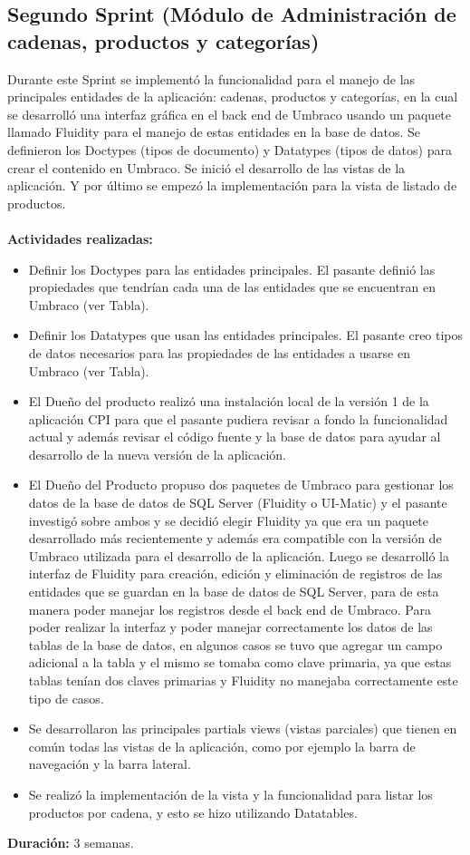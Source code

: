 \subsection{Segundo Sprint (Módulo de Administración de cadenas, productos y categorías)}
Durante este Sprint se implementó la funcionalidad para el manejo de las principales entidades de la aplicación: cadenas, productos y categorías, en la cual se desarrolló una interfaz gráfica en el back end de Umbraco usando un paquete llamado Fluidity para el manejo de estas entidades en la base de datos. Se definieron los Doctypes (tipos de documento) y Datatypes (tipos de datos) para crear el contenido en Umbraco. Se inició el desarrollo de las vistas de la aplicación. Y por último se empezó la implementación para la vista de listado de productos.
\\
\\
\textbf{Actividades realizadas:}
\begin{itemize}
   \item Definir los Doctypes para las entidades principales. El pasante definió las propiedades que tendrían cada una de las entidades que se encuentran en Umbraco (ver Tabla).
   \item Definir los Datatypes que usan las entidades principales. El pasante creo tipos de datos necesarios para las propiedades de las entidades a usarse en Umbraco (ver Tabla).
   \item El Dueño del producto realizó una instalación local de la versión 1 de la aplicación CPI para que el pasante pudiera revisar a fondo la funcionalidad actual y además revisar el código fuente y la base de datos para ayudar al desarrollo de la nueva versión de la aplicación.
   \item El Dueño del Producto propuso dos paquetes de Umbraco para gestionar los datos de la base de datos de SQL Server (Fluidity o UI-Matic) y el pasante investigó sobre ambos y se decidió elegir Fluidity ya que era un paquete desarrollado más recientemente y además era compatible con la versión de Umbraco utilizada para el desarrollo de la aplicación. Luego se desarrolló la interfaz de Fluidity para creación, edición y eliminación de registros de las entidades que se guardan en la base de datos de SQL Server, para de esta manera poder manejar los registros desde el back end de Umbraco. Para poder realizar la interfaz y poder manejar correctamente los datos de las tablas de la base de datos, en algunos casos se tuvo que agregar un campo adicional a la tabla y el mismo se tomaba como clave primaria, ya que estas tablas tenían dos claves primarias y Fluidity no manejaba correctamente este tipo de casos.
   \item Se desarrollaron las principales partials views (vistas parciales) que tienen en común todas las vistas de la aplicación, como por ejemplo la barra de navegación y la barra lateral.
   \item Se realizó la implementación de la vista y la funcionalidad para listar los productos por cadena, y esto se hizo utilizando Datatables.
\end{itemize}
\textbf{Duración:} 3 semanas.


